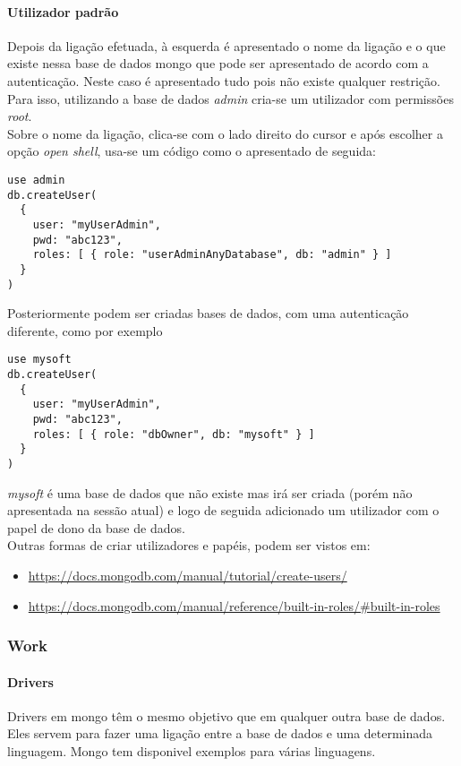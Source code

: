 \paragraph{Utilizador padrão}
Depois da ligação efetuada, à esquerda é apresentado o nome da ligação e o que existe nessa base de dados mongo que pode ser apresentado de acordo com a autenticação. Neste caso é apresentado tudo pois não existe qualquer restrição. Para isso, utilizando a base de dados \textit{admin} cria-se um utilizador com permissões \textit{root}.\newline \\
Sobre o nome da ligação, clica-se com o lado direito do cursor e após escolher a opção \textit{open shell}, usa-se um código como o apresentado de seguida:
\begin{lstlisting}[style=json]
use admin
db.createUser(
  {
    user: "myUserAdmin",
    pwd: "abc123",
    roles: [ { role: "userAdminAnyDatabase", db: "admin" } ]
  }
)
\end{lstlisting}
Posteriormente podem ser criadas bases de dados, com uma autenticação diferente, como por exemplo
\begin{lstlisting}[style=json]
use mysoft
db.createUser(
  {
    user: "myUserAdmin",
    pwd: "abc123",
    roles: [ { role: "dbOwner", db: "mysoft" } ]
  }
)
\end{lstlisting}
\textit{mysoft} é uma base de dados que não existe mas irá ser criada (porém não apresentada na sessão atual) e logo de seguida adicionado um utilizador com o papel de dono da base de dados.\newline \\
Outras formas de criar utilizadores e papéis, podem ser vistos em:
\begin{itemize}
\item \url{https://docs.mongodb.com/manual/tutorial/create-users/}
\item \url{https://docs.mongodb.com/manual/reference/built-in-roles/#built-in-roles}
\end{itemize}

\subsubsection{Work}

\paragraph{Drivers}
Drivers em mongo têm o mesmo objetivo que em qualquer outra base de dados. Eles servem para fazer uma ligação entre a base de dados e uma determinada linguagem. Mongo tem disponivel exemplos para várias linguagens.

